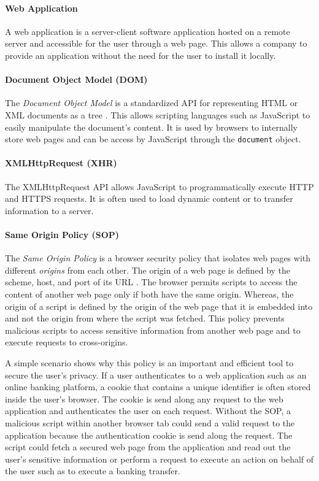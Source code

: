 \paragraph{Web Application}

	A web application is a server-client software application hosted on a remote server and accessible for the user through a web page. This allows a company to provide an application without the need for the user to install it locally.

\paragraph{Document Object Model (DOM)}

	The \textit{Document Object Model} is a standardized API for representing HTML or XML documents as a tree \cite{w3cDOMSpecification}. This allows scripting languages such as JavaScript to easily manipulate the document's content. It is used by browsers to internally store web pages and can be access by JavaScript through the \texttt{document} object. 

\paragraph{XMLHttpRequest (XHR)}

	The XMLHttpRequest API allows JavaScript to programmatically execute HTTP and HTTPS requests. It is often used to load dynamic content or to transfer information to a server. 

\paragraph{Same Origin Policy (SOP)}
	
	The \textit{Same Origin Policy} is a browser security policy that isolates web pages with different \textit{origins} from each other. The origin of a web page is defined by the scheme, host, and port of its URL \cite{w3cOriginSpecification}. The browser permits scripts to access the content of another web page only if both have the same origin. Whereas, the origin of a script is defined by the origin of the web page that it is embedded into and not the origin from where the script was fetched. This policy prevents malicious scripts to access sensitive information from another web page and to execute requests to cross-origins. 
	
	A simple scenario shows why this policy is an important and efficient tool to secure the user's privacy. If a user authenticates to a web application such as an online banking platform, a cookie that contains a unique identifier is often stored inside the user's browser. The cookie is send along any request to the web application and authenticates the user on each request. Without the SOP, a malicious script within another browser tab could send a valid request to the application because the authentication cookie is send along the request. The script could fetch a secured web page from the application and read out the user's sensitive information or perform a request to execute an action on behalf of the user such as to execute a banking transfer.  
	

